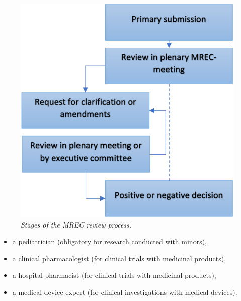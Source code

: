 \documentclass[authordate, meta, issue]{jote-new-article}
\begin{document}
\begin{figure}[b!]
  \begin{fullwidth}
    \includegraphics[width=\linewidth]{media/Picture1.png}

    \caption{\emph{Stages of the MREC review process.}}
  \end{fullwidth}
\end{figure}
\begin{itemize}

  \newpage


  \item a pediatrician (obligatory for research conducted with minors),



  \item
        a clinical pharmacologist (for clinical trials with medicinal products),



  \item a hospital pharmacist (for clinical trials with medicinal products),



  \item
        a medical device expert (for clinical investigations with medical devices).


\end{itemize}
\end{document}

